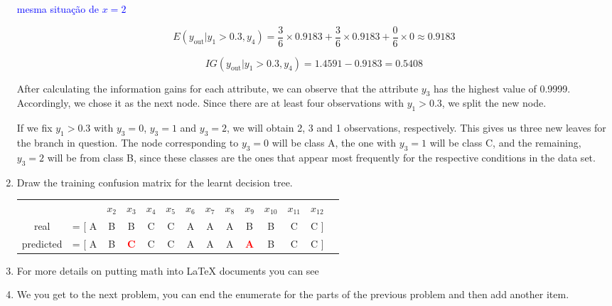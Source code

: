 \documentclass[12pt]{article}
\begin{document}
\begin{enumerate}[leftmargin=\labelsep]
\textcolor{blue}{mesma situação de $x=2$}

\begin{equation*}
    E(y_{\text{out}}|y_1 > 0.3, y_4) = \frac{3}{6} \times 0.9183 + \frac{3}{6} \times 0.9183 + \frac{0}{6} \times 0 \approx 0.9183
\end{equation*}

\begin{equation*}
    IG(y_{\text{out}} | y_1 > 0.3, y_4) = 1.4591 - 0.9183 = 0.5408
\end{equation*}

\vspace{0.5cm}

\hspace*{2em}After calculating the information gains for each attribute, we can observe that the attribute $y_3$ has the highest value of 0.9999. 
Accordingly, we chose it as the next node. Since there are at least four observations with $y_1 > 0.3$, we split the new node. 

\hspace*{2em}If we fix $y_1 > 0.3$ with $y_3 = 0$, $y_3 = 1$ and $y_3 = 2$, we will obtain 2, 3 and 1 observations, respectively. This gives us three new leaves for the branch in question. The node corresponding to $y_3 = 0$ will be class A, the one with $y_3 = 1$ will be class C, and the remaining, $y_3 = 2$ will be from class B, since these classes are the ones that appear most frequently for the respective conditions in the data set.


\newpage

\item Draw the training confusion matrix for the learnt decision tree.
\begin{center}
    \begin{tabular}{cccccccccccccc}
        \multicolumn{2}{c}{}  $x_1$ & $x_2$ & $x_3$ & $x_4$ & $x_5$ & $x_6$ & $x_7$ & $x_8$ & $x_9$ & $x_{10}$ & $x_{11}$ & $x_{12}$ \\
        \multirow{1}{*}{real}      & =    [ A & B & B & C & C & A & A & A & B & B & C & C  ] \\
        \multirow{1}{*}{predicted} & =   [ A & B & \textcolor{red}{\textbf{C}} & C & C & A & A & A & \textcolor{red}{\textbf{A}} & B & C & C  ]
  \end{tabular}
\end{center}
    
\item For more details on putting math into {\LaTeX} documents you can see 

\item We you get to the next problem, you can end the enumerate for the parts of the previous problem and then add another item.
\end{enumerate}
\end{document}
